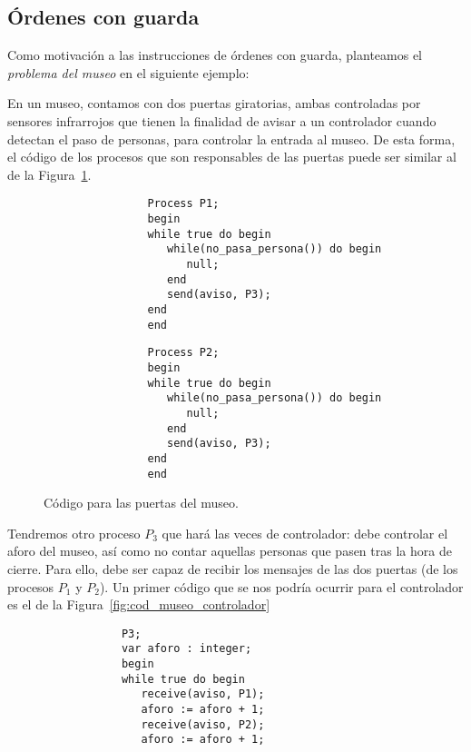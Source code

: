 \subsection{Órdenes con guarda}\label{sec:ordenes_guarda}
Como motivación a las instrucciones de órdenes con guarda, planteamos el \textit{problema del museo} en el siguiente ejemplo:
\begin{ejemplo}
    En un museo, contamos con dos puertas giratorias, ambas controladas por sensores infrarrojos que tienen la finalidad de avisar a un controlador cuando detectan el paso de personas, para controlar la entrada al museo. De esta forma, el código de los procesos que son responsables de las puertas puede ser similar al de la Figura~\ref{fig:cod_museo}.\\
    \begin{figure}[H]
        \centering
        \setlength{\columnsep}{1cm}
        \begin{multicols}{2}
            \begin{verbatim}
                Process P1;
                begin
                while true do begin
                   while(no_pasa_persona()) do begin
                      null;
                   end
                   send(aviso, P3);
                end
                end
            \end{verbatim}
            \begin{verbatim}
                Process P2;
                begin
                while true do begin
                   while(no_pasa_persona()) do begin
                      null;
                   end
                   send(aviso, P3);
                end
                end
            \end{verbatim}
        \end{multicols}
        \caption{Código para las puertas del museo.}
        \label{fig:cod_museo}
    \end{figure}

    Tendremos otro proceso $P_3$ que hará las veces de controlador: debe controlar el aforo del museo, así como no contar aquellas personas que pasen tras la hora de cierre. Para ello, debe ser capaz de recibir los mensajes de las dos puertas (de los procesos $P_1$ y $P_2$). Un primer código que se nos podría ocurrir para el controlador es el de la Figura~\ref{fig:cod_museo_controlador}
    \begin{figure}
        \centering
        \begin{verbatim}
            P3;
            var aforo : integer;
            begin
            while true do begin
               receive(aviso, P1);
               aforo := aforo + 1;
               receive(aviso, P2);
               aforo := aforo + 1;


\end{verbatim}
\end{figure}
\end{ejemplo}
